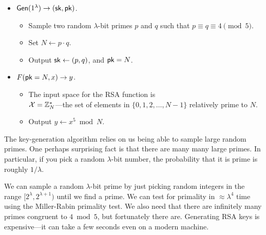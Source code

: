 \begin{itemize}
  \item $\mathsf{Gen}(1^\lambda) \to ({\mathsf{sk}}, \mathsf{pk})$.
  \begin{itemize}
    \item Sample two random $\lambda$-bit primes $p$ and $q$
      such that $p \equiv q \equiv 4 \pmod 5$.
    \item Set $N \gets p \cdot q$.
    \item Output ${\mathsf{sk}} \gets (p, q)$, and $\mathsf{pk} = N$.
  \end{itemize}
  \item $F(\mathsf{pk} = N, x) \to y$.
\begin{itemize}
  \item The input space for the RSA function is \\
    $\mathcal{X} = \mathbb{Z}^*_N$---the set of elements in $\{0, 1, 2, \dots, N-1\}$
    relatively prime to $N$.
    \item Output $y \gets x^5 \bmod N$.
\end{itemize}
\end{itemize}

\begin{remark}
The key-generation algorithm relies on us being able
to sample large random primes.
One perhaps surprising fact is that there are many many 
large primes.
In particular, if you pick a random $\lambda$-bit number,
the probability that it is prime is roughly $1/\lambda$.

We can sample a random $\lambda$-bit prime by just
picking random integers in the range $[2^\lambda, 2^{\lambda + 1})$
until we find a prime.
We can test for primality in $\approx \lambda^4$ time using
the Miller-Rabin primality test.
We also need that there are infinitely many primes congruent to
$4 \bmod 5$, but fortunately there are.
Generating RSA keys is expensive---it can take
a few seconds even on a modern machine.
\end{remark}

